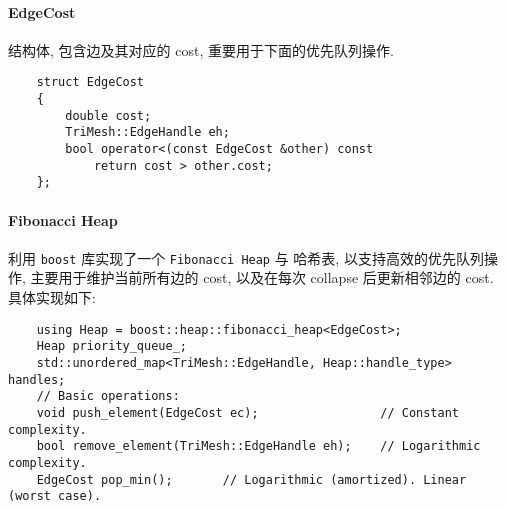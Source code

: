 \documentclass[11pt]{article}
\newcommand\1{\mathds{1}}
\begin{document}
\paragraph{EdgeCost} 结构体, 包含边及其对应的 cost, 重要用于下面的优先队列操作.
\begin{verbatim}
    struct EdgeCost
    {
        double cost;
        TriMesh::EdgeHandle eh;
        bool operator<(const EdgeCost &other) const
            return cost > other.cost; 
    };
\end{verbatim}
\paragraph{Fibonacci Heap} 利用 \texttt{boost} 库实现了一个 \texttt{Fibonacci Heap} 与 哈希表, 
以支持高效的优先队列操作, 主要用于维护当前所有边的 cost, 以及在每次 collapse 后更新相邻边的 cost. 具体实现如下:
\begin{verbatim}
    using Heap = boost::heap::fibonacci_heap<EdgeCost>;
    Heap priority_queue_;
    std::unordered_map<TriMesh::EdgeHandle, Heap::handle_type> handles;
    // Basic operations:
    void push_element(EdgeCost ec);                 // Constant complexity.
    bool remove_element(TriMesh::EdgeHandle eh);    // Logarithmic complexity.
    EdgeCost pop_min();       // Logarithmic (amortized). Linear (worst case).
\end{verbatim}
\end{document}

